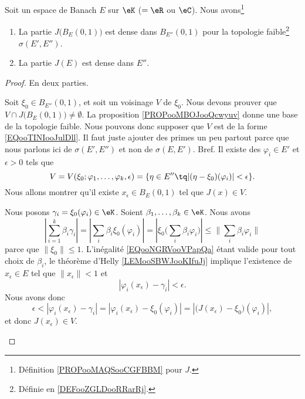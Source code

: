 \begin{theorem}	\label{THOooATSGooSZZYPz}
	Soit un espace de Banach \( E\) sur \( \eK\) (\( =\eR\) ou \( \eC\)). Nous avons\footnote{Définition \ref{PROPooMAQSooCGFBBM} pour \( J\).}
	\begin{enumerate}
		\item		\label{ITEMooMDBQooSVTyjx}
		      La partie \( J\big( B_E(0,1) \big)\) est dense dans \( B_{E''}(0,1)\) pour la topologie faible\footnote{Définie en \ref{DEFooZGLDooRRarRj}.} \( \sigma(E',E'')\).
		\item		\label{ITEMooXIGCooVpzqGA}
		      La partie \( J(E)\) est dense dans \( E''\).
	\end{enumerate}
\end{theorem}

\begin{proof}
	En deux parties.
	\begin{subproof}

		Soit \( \xi_0\in B_{E''}(0,1)\), et soit un voisinage \( V\) de \( \xi_0\). Nous devons prouver que \( V\cap J\big( B_E(0,1) \big)\neq \emptyset\). La proposition \ref{PROPooMBOJooQcwyuv} donne une base de la topologie faible. Nous pouvons donc supposer que \( V\) est de la forme \eqref{EQooTINIooJulDll}. Il faut juste ajouter des primes un peu partout parce que nous parlons ici de \( \sigma(E',E'') \) et non de \( \sigma(E,E')\). Bref. Il existe des \( \varphi_i\in E'\) et \( \epsilon>0\) tels que
		\begin{equation}
			V=V(\xi_0;\varphi_1,\ldots,\varphi_k,\epsilon)=\{ \eta\in E''\tq | (\eta-\xi_0)(\varphi_i) |<\epsilon \}.
		\end{equation}
		Nous allons montrer qu'il existe \( x_{\epsilon}\in B_E(0,1)\) tel que \( J(x)\in V\).

		Nous posons \( \gamma_i=\xi_0(\varphi_i)\in \eK\). Soient \( \beta_1,\ldots,\beta_k\in \eK\). Nous avons
		\begin{equation}		\label{EQooNGRVooVPapQa}
			|\sum_{i=1}^k\beta_i\gamma_i|=|\sum_i\beta_i\xi_0(\varphi_i)|=|\xi_0\big( \sum_i\beta_i\varphi_i \big)|\leq \| \sum_i\beta_i\varphi_i \|
		\end{equation}
		parce que \( \| \xi_0 \|\leq 1\). L'inégalité \eqref{EQooNGRVooVPapQa} étant valide pour tout choix de \( \beta_i\), le théorème d'Helly \ref{LEMooSBWJooKIfuJj} implique l'existence de \( x_{\epsilon}\in E\) tel que \( \| x_{\epsilon} \|<1\) et
		\begin{equation}
			| \varphi_i(x_{\epsilon})-\gamma_i |<\epsilon.
		\end{equation}
		Nous avons donc
		\begin{equation}
			\epsilon<| \varphi_i(x_{\epsilon})-\gamma_i |=| \varphi_i(x_{\epsilon})-\xi_0(\varphi_i) |=| \big( J(x_{\epsilon})-\xi_0 \big)(\varphi_i) |,
		\end{equation}
		et donc \( J(x_{\epsilon})\in V\).


\end{subproof}
\end{proof}
